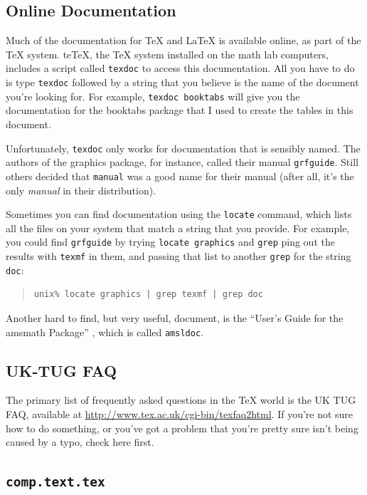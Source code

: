 \documentclass{icmmcm}
\newcommand{\file}[1]{\texttt{#1}\xspace}
\newcommand{\package}[1]{\textsf{#1}\xspace}
\newcommand{\prog}[1]{\texttt{#1}\xspace}
\newcommand{\ctt}{\texttt{comp.text.tex}\xspace}
\newcommand{\tex}{\TeX\xspace}
\newcommand{\latex}{\LaTeX\xspace}
\begin{document}
{\subsection{Online Documentation}

Much of the documentation for \tex and \latex is available online, as
part of the \tex system.  te\tex, the \tex system installed on the
math lab computers, includes a script called \prog{texdoc} to access
this documentation.  All you have to do is type \prog{texdoc} followed
by a string that you believe is the name of the document you're
looking for.  For example, \prog{texdoc booktabs} will give you the
documentation for the \package{booktabs} package that I used to create
the tables in this document.

Unfortunately, \prog{texdoc} only works for documentation that is
sensibly named.  The authors of the \package{graphics} package, for
instance, called their manual \file{grfguide}.  Still others decided
that \file{manual} was a good name for their manual (after all, it's
the only \emph{manual} in their distribution).

Sometimes you can find documentation using the \prog{locate} command,
which lists all the files on your system that match a string that you
provide.  For example, you could find \file{grfguide} by trying
\prog{locate graphics} and \prog{grep}ping out the results with
\file{texmf} in them, and passing that list to another \prog{grep} for
the string \file{doc}:
\begin{quote}
\begin{verbatim}
unix% locate graphics | grep texmf | grep doc
\end{verbatim}
\end{quote}

Another hard to find, but very useful, document, is the ``User's Guide
for the \package{amsmath} Package'' \citeyearpar{amsmath-doc}, which
is called \file{amsldoc}.


\subsection{UK-TUG FAQ}

The primary list of frequently asked questions in the \tex world is
the UK TUG FAQ, available at
\url{http://www.tex.ac.uk/cgi-bin/texfaq2html}.  If you're not sure
how to do something, or you've got a problem that you're pretty sure
isn't being caused by a typo, check here first.


\subsection{\ctt}

}
\end{document}
